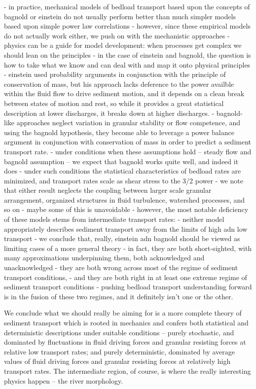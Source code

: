 \documentclass{article}
\begin{document}
- in practice, mechanical models of bedload transport based upon the concepts of bagnold or einstein do not usually perform better than much simpler models based upon simple power law correlations
- however, since these empirical models do not actually work either, we push on with the mechanistic approaches
- physics can be a guide for model development: when processes get complex we should lean on the principles
- in the case of einstein and bagnold, the question is how to take what we know and can deal with and map it onto physical principles
- einstein used probability arguments in conjunction with the principle of conservation of mass, but his approach lacks deference to the power availble within the fluid flow to drive sediment motion, and it depends on a clean break between states of motion and rest, so while it provides a great statistical description at lower discharges, it breaks down at higher discharges. 
- bagnold-like approaches neglect variation in granular stability or flow competence, and using the bagnold hypothesis, they become able to leverage a power balance argument in conjunction with conservation of mass in order to predict a sediment transport rate. 
- under conditions when these assumptions hold -- steady flow and bagnold assumption -- we expect that bagnold works quite well, and indeed it does
- under such conditions the statistical characteristics of bedload rates are minimized, and transport rates scale as shear stress to the 3/2 power
- we note that either result neglects the coupling between larger scale granular arrangement, organized structures in fluid turbulence, watershed processes, and so on
- maybe some of this is unavoidable 
- however, the most notable deficiency of these models stems from intermediate transport rates: 
- neither model appropriately describes sediment transport away from the limits of high adn low transport
- we conclude that, really, einstein adn bagnold should be viewed as limiting cases of a more general theory
- in fact, they are both short-sighted, with many approximations underpinning them, both acknowledged and unacknowledged
- they are both wrong across most of the regime of sediment transport conditions, 
- and they are both right in at least one extreme regime of sediment transport conditions
- pushing bedload transport understanding forward is in the fusion of these two regimes, and it definitely isn't one or the other. 


We conclude what we should really be aiming for is a more complete theory of sediment transport which is rooted in mechanics and confers both statistical and deterministic descriptions under suitable conditions -- purely stochastic, and dominated by fluctuations in fluid driving forces and granular resisting forces at relative low transport rates; and purely deterministic, dominated by average values of fluid driving forces and granular resisting forces at relatively high transport rates. 
The intermediate region, of course, is where the really interesting physics happen -- the river morphology. 
\end{document}
